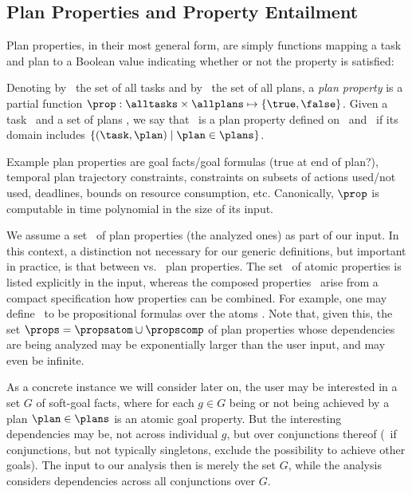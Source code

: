 \subsection{Plan Properties and Property Entailment}

Plan properties, in their most general form, are simply functions
mapping a task and plan to a Boolean value indicating whether or not
the property is satisfied:

\begin{definition}
Denoting by \alltasks\ the set of all tasks and by \allplans\ the set
of all plans, a \emph{plan property} is a partial function $\prop :
\alltasks \times \allplans \mapsto \{\true, \false\}$. Given a task
\task\ and a set of plans \plans, we say that \prop\ is a plan
property defined on \task\ and \plans\ if its domain includes
$\{(\task,\plan) \mid \plan \in \plans\}$.
\end{definition}

Example plan properties are goal facts/goal formulas (true at end of
plan?), temporal plan trajectory constraints, constraints on subsets
of actions used/not used, deadlines, bounds on resource consumption,
etc. Canonically, $\prop$ is computable in time polynomial in the size
of its input.

We assume a set \props\ of plan properties (the analyzed ones) as part
of our input. In this context, a distinction not necessary for our
generic definitions, but important in practice, is that between
 vs.\  plan properties. The set
\propsatom\ of atomic properties is listed explicitly in the input,
whereas the composed properties \propscomp\ arise from a compact
specification how properties can be combined. For example, one may
define \propscomp\ to be propositional formulas over the atoms
\propsatom. Note that, given this, the set $\props = \propsatom \cup
\propscomp$ of plan properties whose dependencies are being analyzed
may be exponentially larger than the user input, and may even be
infinite.

As a concrete instance we will consider later on, the user may be
interested in a set $G$ of soft-goal facts, where for each $g \in G$
being or not being achieved by a plan $\plan \in \plans$ is an atomic
goal property. But the interesting dependencies may be, not across
individual $g$, but over conjunctions thereof (\eg\ if conjunctions,
but not typically singletons, exclude the possibility to achieve other
goals). The input to our analysis then is merely the set $G$, while
the analysis considers dependencies across all conjunctions over $G$.

